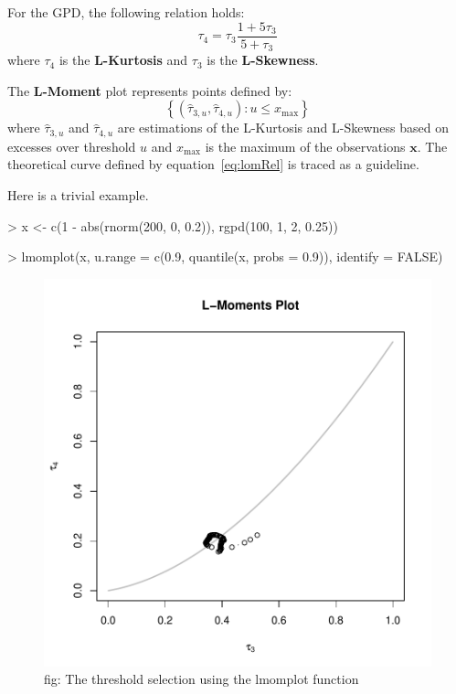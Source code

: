 \documentclass[a4paper]{article}
\numberwithin{equation}{section}
\theoremstyle{definition}
\begin{document}
For the GPD, the following relation holds:
\begin{equation}
  \label{eq:lomRel}
  \tau_4 = \tau_3 \frac{1 + 5 \tau_3}{5 + \tau_3}
\end{equation}
where $\tau_4$ is the \textbf{L-Kurtosis} and $\tau_3$ is the
\textbf{L-Skewness}.

The \textbf{L-Moment} plot represents points defined by:
\begin{equation}
  \label{eq:lmomplot}
  \left\{\left(\hat{\tau}_{3,u}, \hat{\tau}_{4,u}\right) : u \leq
    x_\mathrm{max} \right\}  
\end{equation}
where $\hat{\tau}_{3,u}$ and $\hat{\tau}_{4,u}$ are estimations of the
L-Kurtosis and L-Skewness based on excesses over threshold $u$ and
$x_\mathrm{max}$ is the maximum of the observations $\mathbf{x}$. The
theoretical curve defined by equation~\eqref{eq:lomRel} is traced as a
guideline.

Here is a trivial example.
\begin{Schunk}
\begin{Sinput}
> x <- c(1 - abs(rnorm(200, 0, 0.2)), rgpd(100, 1, 2, 0.25))
\end{Sinput}
\end{Schunk}
\begin{Schunk}
\begin{Sinput}
> lmomplot(x, u.range = c(0.9, quantile(x, probs = 0.9)), identify = FALSE)
\end{Sinput}
\end{Schunk}

\begin{figure}
\begin{center}
\includegraphics{guide-010}
\end{center}
\label{fig:lmomplot}
\caption{fig: The threshold selection using the lmomplot function}
\end{figure}
\end{document}
